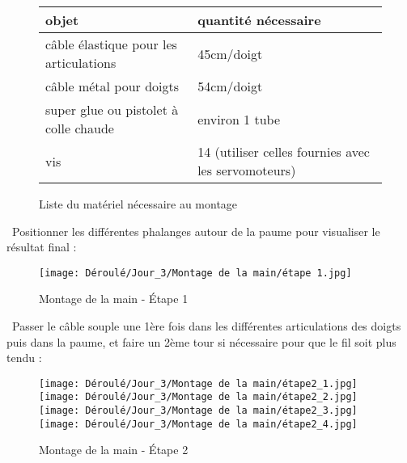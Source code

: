 \begin{flushleft}
\begin{figure}[!h]
    \centering
\begin{tabular}{|l|l|}
    \hline objet & quantité nécessaire  \\
    \hline câble élastique pour les articulations & 45cm/doigt\\
    \hline câble métal pour doigts & 54cm/doigt\\
    \hline super glue ou pistolet à colle chaude & environ 1 tube\\
    \hline vis & 14 (utiliser celles fournies avec les servomoteurs)\\
    \hline
\end{tabular}
\caption{Liste du matériel nécessaire au montage}
\label{fig:my_label}
\end{figure}
\end{flushleft}

\begin{flushleft}
\textbullet \, Positionner les différentes phalanges autour de la paume pour visualiser le résultat final :
\end{flushleft}

\begin{figure}[!h]
    \centering
    \texttt{[image: Déroulé/Jour\_3/Montage de la main/étape 1.jpg]}
    \caption{Montage de la main - \'Etape 1}
    \label{fig:my_label}
\end{figure}

\newpage

\begin{flushleft}
\textbullet \, Passer le câble souple une 1ère fois dans les différentes articulations des doigts puis dans la paume, et faire un 2ème tour si nécessaire pour que le fil soit plus tendu :
\end{flushleft}

\begin{figure}[!h]
    \centering
    \texttt{[image: Déroulé/Jour\_3/Montage de la main/étape2\_1.jpg]}
    \texttt{[image: Déroulé/Jour\_3/Montage de la main/étape2\_2.jpg]}
    \texttt{[image: Déroulé/Jour\_3/Montage de la main/étape2\_3.jpg]}
    \texttt{[image: Déroulé/Jour\_3/Montage de la main/étape2\_4.jpg]}
    \caption[\'Etape 2]{Montage de la main - \'Etape 2}
    \label{fig:my_label}
\end{figure}

